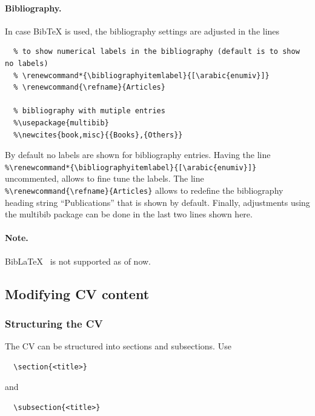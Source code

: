 \documentclass[a4paper,11pt]{article}
\newcommand{\biblatex}{BibLaTeX}
\begin{document}
\paragraph{Bibliography.}
In case BibTeX is used, the bibliography settings are adjusted in the lines
\begin{lstlisting}
  % to show numerical labels in the bibliography (default is to show no labels)
  % \renewcommand*{\bibliographyitemlabel}{[\arabic{enumiv}]}
  % \renewcommand{\refname}{Articles}

  % bibliography with mutiple entries
  %\usepackage{multibib}
  %\newcites{book,misc}{{Books},{Others}}
\end{lstlisting}
By default no labels are shown for bibliography entries.
Having the line
\lstinline!%\renewcommand*{\bibliographyitemlabel}{[\arabic{enumiv}]}! uncommented,
allows to fine tune the labels.
The line \lstinline!%\renewcommand{\refname}{Articles}! allows to redefine the bibliography heading string ``Publications'' that is shown by default.
Finally, adjustments using the multibib package can be done in the last two lines shown here.

\paragraph{Note.} \biblatex~ is not supported as of now.

\subsection{Modifying CV content}
\subsubsection{Structuring the CV}
The CV can be structured into sections and subsections. Use

\begin{lstlisting}
  \section{<title>}
\end{lstlisting}

and

\begin{lstlisting}
  \subsection{<title>}
\end{lstlisting}
\end{document}
